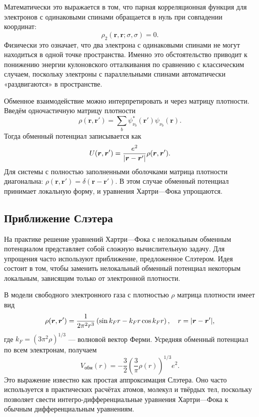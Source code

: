 \documentclass[a4paper, 12pt]{article}
\numberwithin{equation}{section}
\begin{document}
Математически это выражается в том, что парная корреляционная функция для электронов с одинаковыми спинами обращается в нуль при совпадении координат:
\begin{equation}
\label{eq:fermi_hole}
\rho_2(\bm{r}, \bm{r}; \sigma, \sigma) = 0.
\end{equation}
Физически это означает, что два электрона с одинаковыми спинами не могут находиться в одной точке пространства. Именно это обстоятельство приводит к понижению энергии кулоновского отталкивания по сравнению с классическим случаем, поскольку электроны с параллельными спинами автоматически «раздвигаются» в пространстве.

Обменное взаимодействие можно интерпретировать и через матрицу плотности. Введём одночастичную матрицу плотности
\begin{equation}
\label{eq:density_matrix}
\rho(\bm{r}, \bm{r}') = \sum_{b} \psi_{\nu_b}^*(\bm{r}') \psi_{\nu_b}(\bm{r}).
\end{equation}
Тогда обменный потенциал записывается как
\begin{equation}
U(\bm{r}, \bm{r}') = \frac{e^2}{\abs{\bm{r} - \bm{r}'}} \rho(\bm{r}, \bm{r}').
\end{equation}
Для системы с полностью заполненными оболочками матрица плотности диагональна: $\rho(\bm{r}, \bm{r}') = \delta(\bm{r} - \bm{r}')$. В этом случае обменный потенциал принимает локальную форму, и уравнения Хартри---Фока упрощаются.

\subsection{Приближение Слэтера}
\label{subsec:slater_approximation}

На практике решение уравнений Хартри---Фока с нелокальным обменным потенциалом представляет собой сложную вычислительную задачу. Для упрощения часто используют приближение, предложенное Слэтером. Идея состоит в том, чтобы заменить нелокальный обменный потенциал некоторым локальным, зависящим только от электронной плотности.

В модели свободного электронного газа с плотностью $\rho$ матрица плотности имеет вид
\begin{equation}
\label{eq:free_electron_density_matrix}
\rho(\bm{r}, \bm{r}') = \frac{1}{2\pi^2 r^3} \left( \sin k_F r - k_F r \cos k_F r \right), \quad r = \abs{\bm{r} - \bm{r}'},
\end{equation}
где $k_F = (3\pi^2 \rho)^{1/3}$ --- волновой вектор Ферми. Усредняя обменный потенциал по всем электронам, получаем
\begin{equation}
\label{eq:slater_exchange}
V_{\text{обм}}(r) = -\frac{3}{2} \left( \frac{3}{\pi} \rho(r) \right)^{1/3} e^2.
\end{equation}
Это выражение известно как простая аппроксимация Слэтера. Оно часто используется в практических расчётах атомов, молекул и твёрдых тел, поскольку позволяет свести интегро-дифференциальные уравнения Хартри---Фока к обычным дифференциальным уравнениям.
\end{document}
